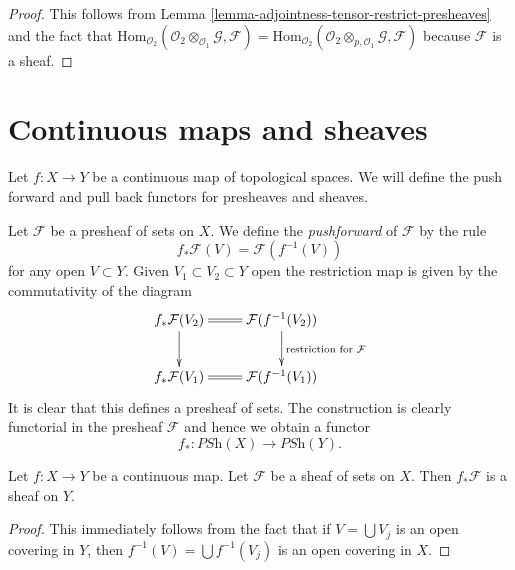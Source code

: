 \begin{proof}
This follows from
Lemma \ref{lemma-adjointness-tensor-restrict-presheaves}
and the fact that
$\text{Hom}_{\mathcal{O}_2}(
\mathcal{O}_2 \otimes_{\mathcal{O}_1} \mathcal{G},
\mathcal{F}
)
=
\text{Hom}_{\mathcal{O}_2}(
\mathcal{O}_2 \otimes_{p, \mathcal{O}_1} \mathcal{G},
\mathcal{F}
)$
because $\mathcal{F}$ is a sheaf.
\end{proof}




















\section{Continuous maps and sheaves}
\label{section-presheaves-functorial}

\noindent
Let $f : X \to Y$ be a continuous map of topological spaces.
We will define the push forward and pull back functors for
presheaves and sheaves.

\medskip\noindent
Let $\mathcal{F}$ be a presheaf of sets on $X$. We define the
{\it pushforward} of $\mathcal{F}$ by the rule
$$
f_*\mathcal{F}(V) = \mathcal{F}(f^{-1}(V))
$$
for any open $V \subset Y$.
Given $V_1 \subset V_2 \subset Y$ open the restriction map
is given by the commutativity of the diagram
$$
\xymatrix{
f_*\mathcal{F}(V_2) \ar[d] \ar@{=}[r] &
\mathcal{F}(f^{-1}(V_2)) \ar[d]^{\text{restriction for }\mathcal{F}} \\
f_*\mathcal{F}(V_1) \ar@{=}[r] &
\mathcal{F}(f^{-1}(V_1))
}
$$
It is clear that this defines a presheaf of sets. The construction
is clearly functorial in the presheaf $\mathcal{F}$ and hence
we obtain a functor
$$
f_* : \textit{PSh}(X) \longrightarrow \textit{PSh}(Y).
$$

\begin{lemma}
\label{lemma-pushforward-sheaf}
Let $f : X \to Y$ be a continuous map.
Let $\mathcal{F}$ be a sheaf of sets on $X$.
Then $f_*\mathcal{F}$ is a sheaf on $Y$.
\end{lemma}

\begin{proof}
This immediately follows from the fact that
if $V = \bigcup V_j$ is an open covering in $Y$,
then $f^{-1}(V) = \bigcup f^{-1}(V_j)$ is an open covering in $X$.
\end{proof}

